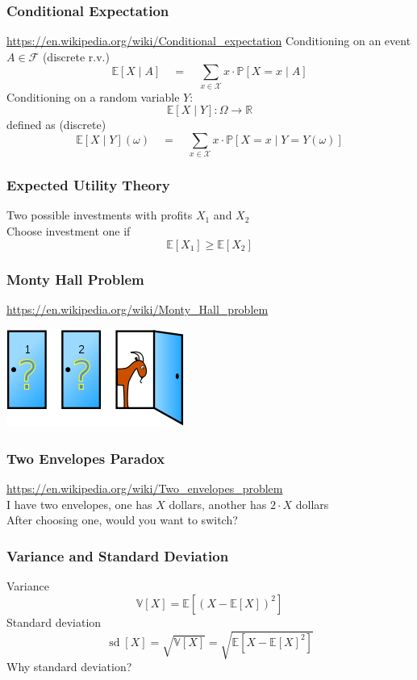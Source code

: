\documentclass{beamer}
\newcommand{\E}[1]{\mathbb{E}\left[#1\right]}
\newcommand{\Real}{\mathbb{R}}
\newcommand{\V}[1]{\mathbb{V}\left[#1\right]}
\newcommand{\sd}[1]{\operatorname{sd}\left[#1\right]}
\renewcommand{\P}[1]{\mathbb{P}\left[#1\right]}
\begin{document}
\begin{frame} \frametitle{Conditional Expectation}
  {\small \url{https://en.wikipedia.org/wiki/Conditional_expectation}}
  Conditioning on an event $A \in \mathcal{F}$ (discrete r.v.)
  \[
  \E{X \mid  A} \quad =\quad  \sum_{x\in \mathcal{X}} x \cdot \P{X=x \mid A} 
  \]
  \vfill
  Conditioning on a random variable $Y$:
  \[
   \E{X \mid Y} \colon \Omega \to \Real 
 \]
 defined as (discrete)
 \[
  \E{X \mid Y}(\omega) \quad =\quad  \sum_{x\in \mathcal{X}} x \cdot \P{X=x \mid Y = Y(\omega)} 
 \]
\end{frame}

\begin{frame} \frametitle{Expected Utility Theory}
  Two possible investments with profits $X_1$ and $X_2$ \\
  \vfill
  Choose investment one if
  \[ \E{ X_1 } \ge \E{ X_2 } \]
\end{frame}

\begin{frame} \frametitle{Monty Hall Problem}
  {\small \url{https://en.wikipedia.org/wiki/Monty_Hall_problem}}
\vfill 
  \begin{center}
    \includegraphics[width=0.7\linewidth]{../figs/prob/monty_hall.png}
  \end{center}
  \vfill 
\end{frame}

\begin{frame} \frametitle{Two Envelopes Paradox}
  {\small\url{https://en.wikipedia.org/wiki/Two_envelopes_problem}}\\[1cm]
  I have two envelopes, one has $X$ dollars, another has $2 \cdot X$ dollars \\
  \vfill
  After choosing one, would you want to switch?
  \vfill 
\end{frame}

\begin{frame} \frametitle{Variance and Standard Deviation}
  Variance
  \[ \V{ X } = \E{ (X - \E{ X })^2 } \]
  \vfill 
  Standard deviation
  \[ \sd{ X } = \sqrt{\V{ X }} = \sqrt{\E{ X - \E{ X }^2 }} \]
  \vfill 
  Why standard deviation?
\end{frame}
\end{document}
